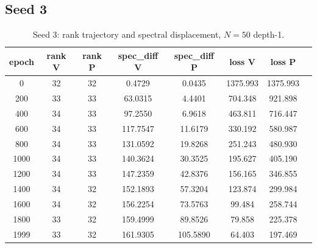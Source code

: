 \subsection*{Seed 3}
\begin{table}[H]
\centering
\caption{Seed 3: rank trajectory and spectral displacement, $N = 50$ depth-1.}
\label{tab:ranspec-s3}
\begin{tabular}{c c c c c c c c}
\toprule
epoch & rank V & rank P & spec\_diff V & spec\_diff P & loss V & loss P \\
\midrule
0 & 32 & 32 & 0.4729 & 0.0435 & 1375.993 & 1375.993 \\
200 & 33 & 33 & 63.0315 & 4.4401 & 704.348 & 921.898 \\
400 & 34 & 33 & 97.2550 & 6.9618 & 463.811 & 716.447 \\
600 & 34 & 33 & 117.7547 & 11.6179 & 330.192 & 580.987 \\
800 & 34 & 33 & 131.0592 & 19.8268 & 251.243 & 480.930 \\
1000 & 34 & 33 & 140.3624 & 30.3525 & 195.627 & 405.190 \\
1200 & 34 & 33 & 147.2359 & 42.8376 & 156.165 & 346.855 \\
1400 & 34 & 32 & 152.1893 & 57.3204 & 123.874 & 299.984 \\
1600 & 34 & 32 & 156.2254 & 73.5763 & 99.484 & 258.744 \\
1800 & 33 & 32 & 159.4999 & 89.8526 & 79.858 & 225.378 \\
1999 & 33 & 32 & 161.9305 & 105.5890 & 64.403 & 197.469 \\
\bottomrule
\end{tabular}
\end{table}

